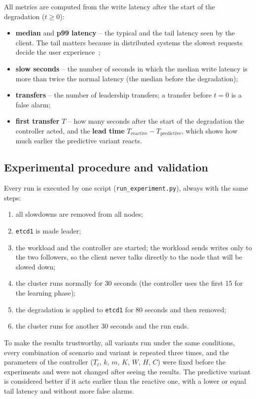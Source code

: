 \documentclass[11pt,a4paper]{article}
\begin{document}
All metrics are computed from the write latency after the start of the degradation ($t \ge 0$):
\begin{itemize}
  \item \textbf{median} and \textbf{p99 latency} -- the typical and the tail latency seen by the client. The tail matters because in distributed systems the slowest requests decide the user experience~\cite{tailatscale};
  \item \textbf{slow seconds} -- the number of seconds in which the median write latency is more than twice the normal latency (the median before the degradation);
  \item \textbf{transfers} -- the number of leadership transfers; a transfer before $t = 0$ is a false alarm;
  \item \textbf{first transfer} $T$ -- how many seconds after the start of the degradation the controller acted, and the \textbf{lead time} $T_{\text{reactive}} - T_{\text{predictive}}$, which shows how much earlier the predictive variant reacts.
\end{itemize}

\subsection{Experimental procedure and validation}

Every run is executed by one script (\texttt{run\_experiment.py}), always with the same steps:
\begin{enumerate}
  \item all slowdowns are removed from all nodes;
  \item \texttt{etcd1} is made leader;
  \item the workload and the controller are started; the workload sends writes only to the two followers, so the client never talks directly to the node that will be slowed down;
  \item the cluster runs normally for 30 seconds (the controller uses the first 15 for the learning phase);
  \item the degradation is applied to \texttt{etcd1} for 80 seconds and then removed;
  \item the cluster runs for another 30 seconds and the run ends.
\end{enumerate}

To make the results trustworthy, all variants run under the same conditions, every combination of scenario and variant is repeated three times, and the parameters of the controller ($T_\ell$, $k$, $m$, $K$, $W$, $H$, $C$) were fixed before the experiments and were not changed after seeing the results. The predictive variant is considered better if it acts earlier than the reactive one, with a lower or equal tail latency and without more false alarms.
\end{document}
